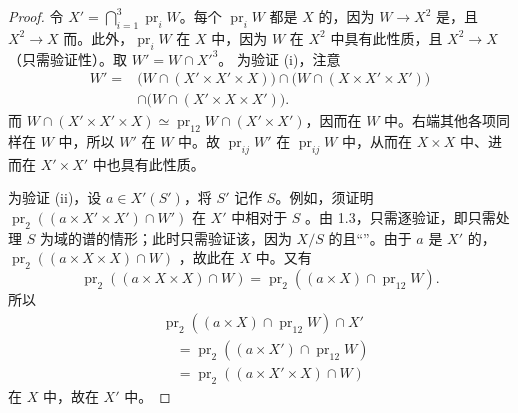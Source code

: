 \begin{proof}
令 $X'=\bigcap_{i=1}^3\operatorname{pr}_iW$。每个 $\operatorname{pr}_iW$ 都是 $X$ 的，因为 $W\to X^2$ 是，且 $X^2\to X$ 而。此外，$\operatorname{pr}_iW$ 在 $X$ 中，因为 $W$ 在 $X^2$ 中具有此性质，且 $X^2\to X$ （只需验证性）。取 $W'=W\cap X'^3$。
为验证 (i)，注意
\[
\begin{aligned}
W'={}&\bigl(W\cap(X'\times X'\times X)\bigr)\cap\bigl(W\cap(X\times X'\times X')\bigr)\\
&\cap\bigl(W\cap(X'\times X\times X')\bigr).
\end{aligned}
\]
而 $W\cap(X'\times X'\times X)\simeq\operatorname{pr}_{12}W\cap(X'\times X')$，因而在 $W$ 中。右端其他各项同样在 $W$ 中，所以 $W'$ 在 $W$ 中。故 $\operatorname{pr}_{ij}W'$ 在 $\operatorname{pr}_{ij}W$ 中，从而在 $X\times X$ 中、进而在 $X'\times X'$ 中也具有此性质。

为验证 (ii)，设 $a\in X'(S')$，将 $S'$ 记作 $S$。例如，须证明 $\operatorname{pr}_2((a\times X'\times X')\cap W')$ 在 $X'$ 中相对于 $S$ 。由 1.3，只需逐验证，即只需处理 $S$ 为域的谱的情形；此时只需验证该，因为 $X/S$ 的且“”。由于 $a$ 是 $X'$ 的，$\operatorname{pr}_2((a\times X\times X)\cap W)$ ，故此在 $X$ 中。又有
\[
\operatorname{pr}_2((a\times X\times X)\cap W)=\operatorname{pr}_2((a\times X)\cap\operatorname{pr}_{12}W).
\]
所以
\[
\begin{aligned}
{}&\operatorname{pr}_2((a\times X)\cap\operatorname{pr}_{12}W)\cap X'\\
&\quad=\operatorname{pr}_2((a\times X')\cap\operatorname{pr}_{12}W)\\
&\quad=\operatorname{pr}_2((a\times X'\times X)\cap W)
\end{aligned}
\]
在 $X$ 中，故在 $X'$ 中。


\end{proof}
